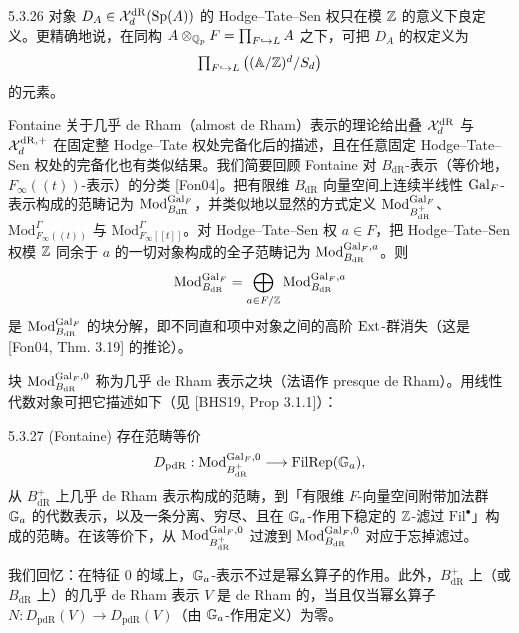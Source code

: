 \begin{rem}{5.3.26}\label{rem:a4-5-3-26}
对象 $D_A\in\mathcal{X}_d^{\mathrm{dR}}(\mathrm{Sp}(A))$ 的 Hodge–Tate–Sen 权只在模 $\mathbb{Z}$ 的意义下良定义。更精确地说，在同构 $A\otimes_{\mathbb{Q}_p}F=\prod_{F\hookrightarrow L}A$ 之下，可把 $D_A$ 的权定义为
\[
\textstyle\prod_{F\hookrightarrow L}\big((\mathbb A/\mathbb{Z})^d/S_d\big)
\]
的元素。
\end{rem}

Fontaine 关于几乎 de Rham（almost de Rham）表示的理论给出叠 $\mathcal{X}_d^{\mathrm{dR}}$ 与 $\mathcal{X}_d^{\mathrm{dR},+}$ 在固定整 Hodge–Tate 权处完备化后的描述，且在任意固定 Hodge–Tate–Sen 权处的完备化也有类似结果。我们简要回顾 Fontaine 对 $B_{\mathrm{dR}}$-表示（等价地，$F_\infty((t))$-表示）的分类 [Fon04]。把有限维 $B_{\mathrm{dR}}$ 向量空间上连续半线性 $\operatorname{Gal}_F$-表示构成的范畴记为 $\mathrm{Mod}^{\operatorname{Gal}_F}_{B_{\mathrm{dR}}}$，并类似地以显然的方式定义 $\mathrm{Mod}^{\operatorname{Gal}_F}_{B^+_{\mathrm{dR}}}$、$\mathrm{Mod}^\Gamma_{F_\infty((t))}$ 与 $\mathrm{Mod}^\Gamma_{F_\infty[[t]]}$。对 Hodge–Tate–Sen 权 $a\in F$，把 Hodge–Tate–Sen 权模 $\mathbb{Z}$ 同余于 $a$ 的一切对象构成的全子范畴记为 $\mathrm{Mod}^{\operatorname{Gal}_F,a}_{B_{\mathrm{dR}}}$。则
\[
\mathrm{Mod}^{\operatorname{Gal}_F}_{B_{\mathrm{dR}}}=\bigoplus_{a\in F/\mathbb{Z}}\mathrm{Mod}^{\operatorname{Gal}_F,a}_{B_{\mathrm{dR}}}
\]
是 $\mathrm{Mod}^{\operatorname{Gal}_F}_{B_{\mathrm{dR}}}$ 的块分解，即不同直和项中对象之间的高阶 $\operatorname{Ext}$-群消失（这是 [Fon04, Thm. 3.19] 的推论）。

块 $\mathrm{Mod}^{\operatorname{Gal}_F,0}_{B_{\mathrm{dR}}}$ 称为几乎 de Rham 表示之块（法语作 presque de Rham）。用线性代数对象可把它描述如下（见 [BHS19, Prop 3.1.1]）：

\begin{thm}{5.3.27 (Fontaine)}\label{thm:a4-5-3-27}
存在范畴等价
\[
D_{\mathrm{pdR}}:\mathrm{Mod}^{\operatorname{Gal}_F,0}_{B^+_{\mathrm{dR}}}\longrightarrow\mathrm{FilRep}(\mathbb{G}_a),
\]
从 $B^+_{\mathrm{dR}}$ 上几乎 de Rham 表示构成的范畴，到「有限维 $F$-向量空间附带加法群 $\mathbb{G}_a$ 的代数表示，以及一条分离、穷尽、且在 $\mathbb{G}_a$-作用下稳定的 $\mathbb{Z}$-滤过 $\mathrm{Fil}^\bullet$」构成的范畴。在该等价下，从 $\mathrm{Mod}^{\operatorname{Gal}_F,0}_{B^+_{\mathrm{dR}}}$ 过渡到 $\mathrm{Mod}^{\operatorname{Gal}_F,0}_{B_{\mathrm{dR}}}$ 对应于忘掉滤过。
\end{thm}

我们回忆：在特征 $0$ 的域上，$\mathbb{G}_a$-表示不过是幂幺算子的作用。此外，$B^+_{\mathrm{dR}}$ 上（或 $B_{\mathrm{dR}}$ 上）的几乎 de Rham 表示 $V$ 是 de Rham 的，当且仅当幂幺算子 $N:D_{\mathrm{pdR}}(V)\to D_{\mathrm{pdR}}(V)$（由 $\mathbb{G}_a$-作用定义）为零。

